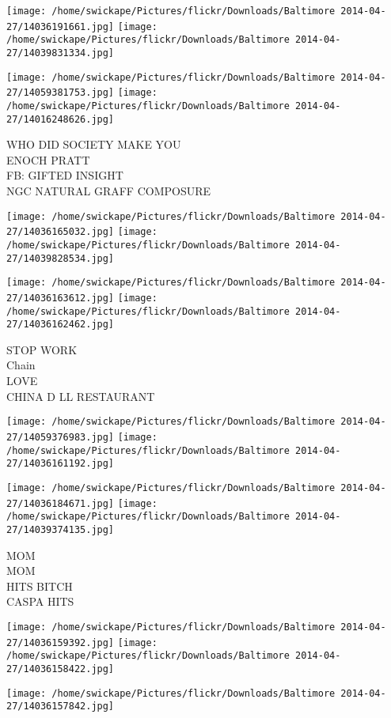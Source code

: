 \documentclass[10pt,letterpaper]{article}
\begin{document}
\texttt{[image: /home/swickape/Pictures/flickr/Downloads/Baltimore 2014-04-27/14036191661.jpg]}
\texttt{[image: /home/swickape/Pictures/flickr/Downloads/Baltimore 2014-04-27/14039831334.jpg]}

\texttt{[image: /home/swickape/Pictures/flickr/Downloads/Baltimore 2014-04-27/14059381753.jpg]}
\texttt{[image: /home/swickape/Pictures/flickr/Downloads/Baltimore 2014-04-27/14016248626.jpg]}

WHO DID SOCIETY MAKE YOU\\
ENOCH PRATT\\
FB: GIFTED INSIGHT\\
NGC NATURAL GRAFF COMPOSURE
\pagebreak

\texttt{[image: /home/swickape/Pictures/flickr/Downloads/Baltimore 2014-04-27/14036165032.jpg]}
\texttt{[image: /home/swickape/Pictures/flickr/Downloads/Baltimore 2014-04-27/14039828534.jpg]}

\texttt{[image: /home/swickape/Pictures/flickr/Downloads/Baltimore 2014-04-27/14036163612.jpg]}
\texttt{[image: /home/swickape/Pictures/flickr/Downloads/Baltimore 2014-04-27/14036162462.jpg]}

STOP WORK\\
Chain\\
LOVE\\
CHINA D LL RESTAURANT
\pagebreak

\texttt{[image: /home/swickape/Pictures/flickr/Downloads/Baltimore 2014-04-27/14059376983.jpg]}
\texttt{[image: /home/swickape/Pictures/flickr/Downloads/Baltimore 2014-04-27/14036161192.jpg]}

\texttt{[image: /home/swickape/Pictures/flickr/Downloads/Baltimore 2014-04-27/14036184671.jpg]}
\texttt{[image: /home/swickape/Pictures/flickr/Downloads/Baltimore 2014-04-27/14039374135.jpg]}

MOM\\
MOM\\
HITS BITCH\\
CASPA HITS
\pagebreak

\texttt{[image: /home/swickape/Pictures/flickr/Downloads/Baltimore 2014-04-27/14036159392.jpg]}
\texttt{[image: /home/swickape/Pictures/flickr/Downloads/Baltimore 2014-04-27/14036158422.jpg]}

\vspace{0.25in}
\texttt{[image: /home/swickape/Pictures/flickr/Downloads/Baltimore 2014-04-27/14036157842.jpg]}
\end{document}
